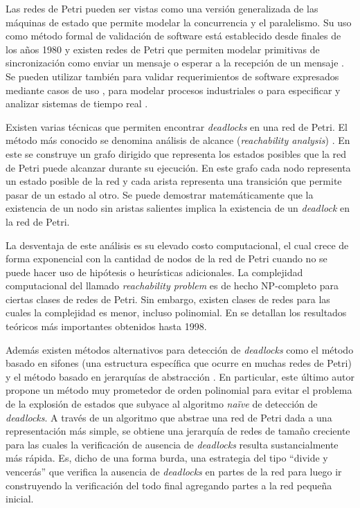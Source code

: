 \documentclass[12pt]{article}
\begin{document}
Las redes de Petri pueden ser vistas como una versión generalizada de las máquinas de estado que permite modelar la concurrencia y el paralelismo.
Su uso como método formal de validación de software está establecido desde finales de los años 1980 y
existen redes de Petri que permiten modelar primitivas de sincronización como enviar un mensaje o esperar a la recepción de un mensaje \cite{heiner1998}.
Se pueden utilizar también para validar requerimientos de software expresados mediante casos de uso \cite{silva-dossantos2004},
para modelar procesos industriales \cite{aalst1994} o para especificar y analizar sistemas de tiempo real \cite{kavi2011}.

Existen varias técnicas que permiten encontrar \textit{deadlocks} en una red de Petri.
El método más conocido se denomina análisis de alcance (\textit{reachability analysis}) \cite{murata1989}.
En este se construye un grafo dirigido que representa los estados posibles que la red de Petri puede alcanzar durante su ejecución.
En este grafo cada nodo representa un estado posible de la red y cada arista representa una transición que permite pasar de un estado al otro.
Se puede demostrar matemáticamente que la existencia de un nodo sin aristas salientes implica la existencia de un \textit{deadlock} en la red de Petri.

La desventaja de este análisis es su elevado costo computacional, el cual crece de forma exponencial
con la cantidad de nodos de la red de Petri cuando no se puede hacer uso de hipótesis o heurísticas adicionales.
La complejidad computacional del llamado \textit{reachability problem} es de hecho NP-completo para ciertas clases de redes de Petri.
Sin embargo, existen clases de redes para las cuales la complejidad es menor, incluso polinomial.
En \cite{esparza1994} se detallan los resultados teóricos más importantes obtenidos hasta 1998.

Además existen métodos alternativos para detección de \textit{deadlocks}
como el método basado en sifones (una estructura específica que ocurre en muchas redes de Petri) \cite{hu2011} y
el método basado en jerarquías de abstracción \cite{kungas2005}.
En particular, este último autor propone un método muy prometedor de orden polinomial para evitar el problema
de la explosión de estados que subyace al algoritmo \textit{naïve} de detección de \textit{deadlocks}.
A través de un algoritmo que abstrae una red de Petri dada a una representación más simple,
se obtiene una jerarquía de redes de tamaño creciente para las cuales la verificación de ausencia de \textit{deadlocks} resulta sustancialmente más rápida.
Es, dicho de una forma burda, una estrategia del tipo ``divide y vencerás'' que verifica la ausencia de \textit{deadlocks}
en partes de la red para luego ir construyendo la verificación del todo final agregando partes a la red pequeña inicial.
\end{document}
